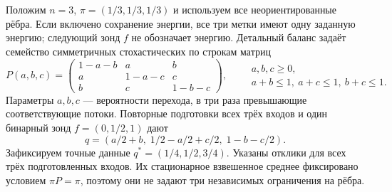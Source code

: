 \section{}
\label{sec:benchmark}
{Положим $n=3$, $\pi=(1/3,1/3,1/3)$ и используем все неориентированные рёбра. Если включено сохранение энергии, все три метки имеют одну заданную энергию; следующий зонд $f$ не обозначает энергию. Детальный баланс задаёт семейство симметричных стохастических по строкам матриц}
\begin{equation}\label{eq:matrix}
 P(a,b,c)=\begin{pmatrix}
 1-a-b & a & b \\
 a & 1-a-c & c \\
 b & c & 1-b-c
 \end{pmatrix},\qquad
 \begin{gathered}a,b,c\geq0,\\a+b\leq1,\ a+c\leq1,\ b+c\leq1.\end{gathered}
\end{equation}
{Параметры $a,b,c$ --- вероятности перехода, в три раза превышающие соответствующие потоки. Повторные подготовки всех трёх входов и один бинарный зонд $f=(0,1/2,1)$ дают}
\begin{equation}\label{eq:means}
 q=(a/2+b,\;1/2-a/2+c/2,\;1-b-c/2).
\end{equation}
{Зафиксируем точные данные $q^*=(1/4,1/2,3/4)$. Указаны отклики для всех трёх подготовленных входов. Их стационарное взвешенное среднее фиксировано условием $\pi P=\pi$, поэтому они не задают три независимых ограничения на рёбра.}

